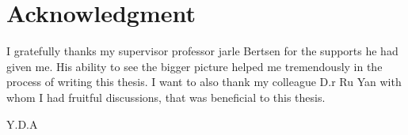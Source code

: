 \documentclass[../Main/thesis.tex]{subfiles}
\begin{document}
\chapter*{Acknowledgment}
I gratefully thanks my supervisor professor jarle Bertsen for the supports he had given me. His ability to see the bigger picture helped me tremendously in the process of writing this thesis. I want to also thank my colleague D.r Ru Yan with whom I had fruitful discussions, that was beneficial to this thesis.


\begin{flushright}
Y.D.A
\end{flushright}

\blankpage
\end{document}
